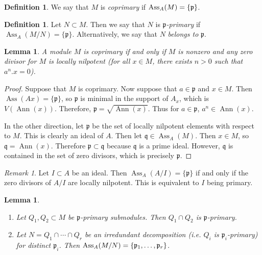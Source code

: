 \documentclass[leqno, openany]{memoir}
\newtheorem{lem}[thm]{Lemma}
\theoremstyle{definition}
\newtheorem{defn}[thm]{Definition}
\theoremstyle{remark}
\newtheorem{rmk}[thm]{Remark}
\theoremstyle{plain}
\theoremstyle{definition}
\theoremstyle{remark}
\newcommand{\mf}[1]{\mathfrak{#1}}
\DeclareMathOperator{\Ann}{Ann}
\DeclareMathOperator{\Ass}{Ass}
\begin{document}
\begin{defn}
    We say that $M$ is \textit{coprimary} if $\Ass_A(M) = \qty{\mf{p}}$. 
\end{defn}

\begin{defn}
    Let $N \subset M$. Then we say that $N$ is \textit{$\mf{p}$-primary} if $\Ass_A(M/N) = \{ \mf{p} \}$. Alternatively, we say that $N$ \textit{belongs to} $\mf{p}$.  
\end{defn}

\begin{lem}
    A module $M$ is coprimary if and only if $M$ is nonzero and any zero divisor for $M$ is locally nilpotent (for all $x \in M$, there exists $n > 0$ such that $a^n . x = 0$).
\end{lem}

\begin{proof}
    Suppose that $M$ is coprimary. Now suppose that $a \in \mf{p}$ and $x \in M$. Then $\Ass(Ax) = \{ \mf{p} \}$, so $\mf{p}$ is minimal in the support of $A_x$, which is $V(\Ann(x))$. Therefore, $\mf{p} = \sqrt{\Ann(x)}$. Thus for $a \in \mf{p}$, $a^n \in \Ann(x)$.
    
    In the other direction, let $\mf{p}$ be the set of locally nilpotent elements with respect to $M$. This is clearly an ideal of $A$. Then let $\mf{q} \in \Ass_A(M)$. Then $x \in M$, so $\mf{q} = \Ann(x)$. Therefore $\mf{p} \subset \mf{q}$ because $\mf{q}$ is a prime ideal. However, $\mf{q}$ is contained in the set of zero divisors, which is precisely $\mf{p}$.
\end{proof}

\begin{rmk}
    Let $I \subset A$ be an ideal. Then $\Ass_A(A/I) = \{ \mf{p} \}$ if and only if the zero divisors of $A/I$ are locally nilpotent. This is equivalent to $I$ being primary.
\end{rmk}

\begin{lem}
    \begin{enumerate}
        \item Let $Q_1, Q_2 \subset M$ be $\mf{p}$-primary submodules. Then $Q_1 \cap Q_2$ is $\mf{p}$-primary.
        \item Let $N = Q_1 \cap \cdots \cap Q_r$ be an irredundant decomposition (i.e. $Q_i$ is $\mf{p}_i$-primary) for distinct $\mf{p}_i$. Then $\Ass_A(M/N) = \qty{\mf{p}_1, \ldots, \mf{p}_r}$. 
    \end{enumerate}
\end{lem}
\end{document}
